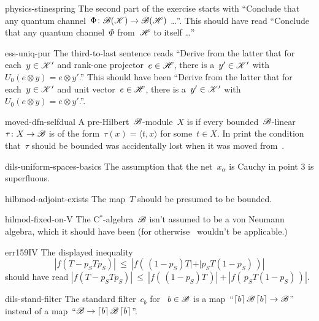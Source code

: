 \begin{erratum}{physics-stinespring}%
The second part of the exercise starts with
    ``Conclude that any quantum channel~$\Phi\colon \mathscr{B}(\mathscr{K}) \to \mathscr{B}(\mathscr{H})$ \ldots''.
This should have read
    ``Conclude that any quantum channel~$\Phi$ from~$\mathscr{H}$ to itself \ldots''
\end{erratum}
\begin{erratum}{ess-uniq-pur}%
The third-to-last sentence reads
``Derive from the latter
that for each~$y \in \mathscr{K}'$ and rank-one projector~$e \in \mathscr{H}$,
there is a~$y' \in \mathscr{K}'$
with~$U_0 (e \otimes y) = e \otimes y'$.''
This should have been
``Derive from the latter
that for each~$y \in \mathscr{K}'$ and unit vector~$e \in \mathscr{H}$,
there is a~$y' \in \mathscr{K}'$
with~$U_0 (e \otimes y) = e \otimes y'$.''.
\end{erratum}
\begin{erratum}{moved-dfn-selfdual}%
    A pre-Hilbert~$\mathscr{B}$-module~$X$ is 
    if every bounded~$\mathscr{B}$-linear~$\tau \colon X \to \mathscr{B}$
    is of the form~$\tau(x) = \langle t, x\rangle$ for some~$t \in X$.
In print the condition that~$\tau$ should be bounded
        was accidentally lost when it was moved from~.
\end{erratum}
\begin{erratum}{dils-uniform-spaces-basics}%
The assumption  that the net~$x_\alpha$ is Cauchy in point 3
    is superfluous.
\end{erratum}
\begin{erratum}{hilbmod-adjoint-exists}%
The map~$T$ should be presumed to be bounded.
\end{erratum}
\begin{erratum}{hilmod-fixed-on-V}%
The C$^*$-algebra~$\mathscr{B}$ isn't assumed to be a von Neumann algebra,
    which it should have been (for otherwise~ wouldn't
    be applicable.)
\end{erratum}
\begin{erratum}{err159IV}%
The displayed
    inequality
\begin{equation*}
    |f(T - p_S T p_S)| \ \leq \  |f(\, (1-p_S) T | +| p_S T (1-p_S) \,)|
\end{equation*}
    should have read
    $|f(T - p_S T p_S)| \ \leq \  |f(\, (1-p_S) T \,) | +| f(\, p_S T (1-p_S) \,)|$.
\end{erratum}
\begin{erratum}{dils-stand-filter}%
The standard filter~$c_b$ for ~$b \in \mathscr{B}$
    is a map~``$\left\lceil b\right\rceil \mathscr{B} \left\lceil b\right\rceil \to \mathscr{B}$''
    instead of a map~``$\mathscr{B} \to \left\lceil b\right\rceil \mathscr{B} \left\lceil b\right\rceil$''.
\end{erratum}
